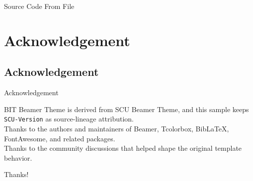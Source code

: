 \documentclass[hyperref, UTF8, CJK, aspectratio=169]{beamer}
\begin{document}
\begin{frame}[fragile]{Source Code From File}
\end{frame}


\section{Acknowledgement}
\subsection{Acknowledgement}
\begin{frame}{Acknowledgement}
	\begin{center}
		BIT Beamer Theme is derived from SCU Beamer Theme, and this sample keeps \texttt{SCU-Version} as source-lineage attribution.\\[1ex]
		Thanks to the authors and maintainers of Beamer, Tcolorbox, BibLaTeX, FontAwesome, and related packages.\\[1ex]
		Thanks to the community discussions that helped shape the original template behavior.\\[1ex]
	\end{center}
\end{frame}

\begin{frame}
	\centering
	\Huge Thanks!
\end{frame}
\end{document}
